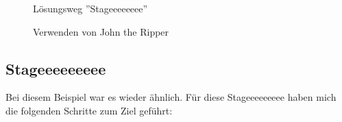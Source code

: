 \documentclass[12pt, a4paper, titlepage, oneside]{scrartcl}
\begin{document}
	\begin{figure}[h!]
		\centering
		\caption{Lösungsweg ''Stageeeeeeee''}
		\label{fig:stageeeeeeee_solution}
	\end{figure}
	\begin{figure}[h!]
		\centering
		\caption{Verwenden von John the Ripper}
		\label{fig:stageeeeeeee_john-the-ripper}
	\end{figure}

	\newpage

	\subsection{Stageeeeeeeee}
	Bei diesem Beispiel war es wieder ähnlich. Für diese Stageeeeeeeee haben mich
	die folgenden Schritte zum Ziel geführt:
\end{document}
